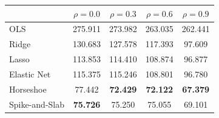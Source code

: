\begin{tabular}{lcccc}
\toprule
 & $\rho=0.0$ & $\rho=0.3$ & $\rho=0.6$ & $\rho=0.9$ \\
\midrule
OLS & 275.911 & 273.982 & 263.035 & 262.441 \\
Ridge & 130.683 & 127.578 & 117.393 & 97.609 \\
Lasso & 113.853 & 114.410 & 108.874 & 96.877 \\
Elastic Net & 115.375 & 115.246 & 108.801 & 96.780 \\
Horseshoe & 77.442 & \textbf{72.429} & \textbf{72.122} & \textbf{67.379} \\
Spike-and-Slab & \textbf{75.726} & 75.250 & 75.055 & 69.101 \\
\bottomrule
\end{tabular}
